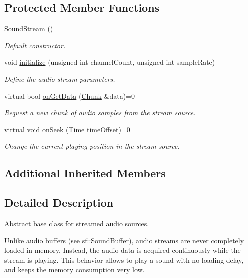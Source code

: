 \subsection*{Protected Member Functions}
\begin{DoxyCompactItemize}
\item 
\hyperlink{classsf_1_1_sound_stream_a769d08f4c3c6b4340ef3a838329d2e5c}{Sound\+Stream} ()
\begin{DoxyCompactList}\small\item\em Default constructor. \end{DoxyCompactList}\item 
void \hyperlink{classsf_1_1_sound_stream_a9c351711198ee1aa77c2fefd3ced4d2c}{initialize} (unsigned int channel\+Count, unsigned int sample\+Rate)
\begin{DoxyCompactList}\small\item\em Define the audio stream parameters. \end{DoxyCompactList}\item 
virtual bool \hyperlink{classsf_1_1_sound_stream_a968ec024a6e45490962c8a1121cb7c5f}{on\+Get\+Data} (\hyperlink{structsf_1_1_sound_stream_1_1_chunk}{Chunk} \&data)=0
\begin{DoxyCompactList}\small\item\em Request a new chunk of audio samples from the stream source. \end{DoxyCompactList}\item 
virtual void \hyperlink{classsf_1_1_sound_stream_a907036dd2ca7d3af5ead316e54b75997}{on\+Seek} (\hyperlink{classsf_1_1_time}{Time} time\+Offset)=0
\begin{DoxyCompactList}\small\item\em Change the current playing position in the stream source. \end{DoxyCompactList}\end{DoxyCompactItemize}
\subsection*{Additional Inherited Members}


\subsection{Detailed Description}
Abstract base class for streamed audio sources. 

Unlike audio buffers (see \hyperlink{classsf_1_1_sound_buffer}{sf\+::\+Sound\+Buffer}), audio streams are never completely loaded in memory. Instead, the audio data is acquired continuously while the stream is playing. This behavior allows to play a sound with no loading delay, and keeps the memory consumption very low.

